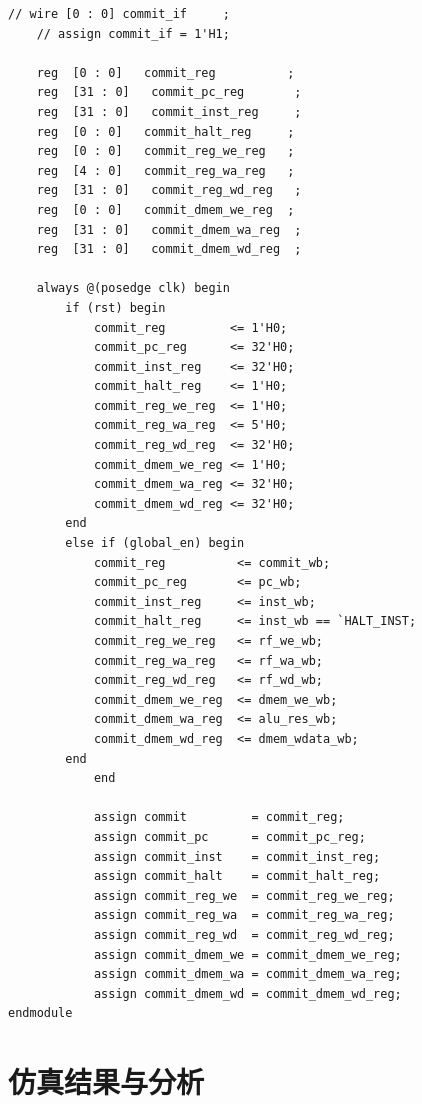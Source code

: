 \documentclass[12pt,a4paper]{ctexart}
\begin{document}
\begin{lstlisting}[style=verilog]
    // wire [0 : 0] commit_if     ;
    // assign commit_if = 1'H1;
    
    reg  [0 : 0]   commit_reg          ;
    reg  [31 : 0]   commit_pc_reg       ;
    reg  [31 : 0]   commit_inst_reg     ;
    reg  [0 : 0]   commit_halt_reg     ;
    reg  [0 : 0]   commit_reg_we_reg   ;
    reg  [4 : 0]   commit_reg_wa_reg   ;
    reg  [31 : 0]   commit_reg_wd_reg   ;
    reg  [0 : 0]   commit_dmem_we_reg  ;
    reg  [31 : 0]   commit_dmem_wa_reg  ;
    reg  [31 : 0]   commit_dmem_wd_reg  ;
    
    always @(posedge clk) begin
        if (rst) begin
            commit_reg         <= 1'H0;
            commit_pc_reg      <= 32'H0;
            commit_inst_reg    <= 32'H0;
            commit_halt_reg    <= 1'H0;
            commit_reg_we_reg  <= 1'H0;
            commit_reg_wa_reg  <= 5'H0;
            commit_reg_wd_reg  <= 32'H0;
            commit_dmem_we_reg <= 1'H0;
            commit_dmem_wa_reg <= 32'H0;
            commit_dmem_wd_reg <= 32'H0;
        end
        else if (global_en) begin
            commit_reg          <= commit_wb;
            commit_pc_reg       <= pc_wb;
            commit_inst_reg     <= inst_wb;
            commit_halt_reg     <= inst_wb == `HALT_INST;
            commit_reg_we_reg   <= rf_we_wb;
            commit_reg_wa_reg   <= rf_wa_wb;
            commit_reg_wd_reg   <= rf_wd_wb;
            commit_dmem_we_reg  <= dmem_we_wb;
            commit_dmem_wa_reg  <= alu_res_wb;
            commit_dmem_wd_reg  <= dmem_wdata_wb;
        end
            end
            
            assign commit         = commit_reg;
            assign commit_pc      = commit_pc_reg;
            assign commit_inst    = commit_inst_reg;
            assign commit_halt    = commit_halt_reg;
            assign commit_reg_we  = commit_reg_we_reg;
            assign commit_reg_wa  = commit_reg_wa_reg;
            assign commit_reg_wd  = commit_reg_wd_reg;
            assign commit_dmem_we = commit_dmem_we_reg;
            assign commit_dmem_wa = commit_dmem_wa_reg;
            assign commit_dmem_wd = commit_dmem_wd_reg;
endmodule
\end{lstlisting}
\section{仿真结果与分析}
\end{document}
